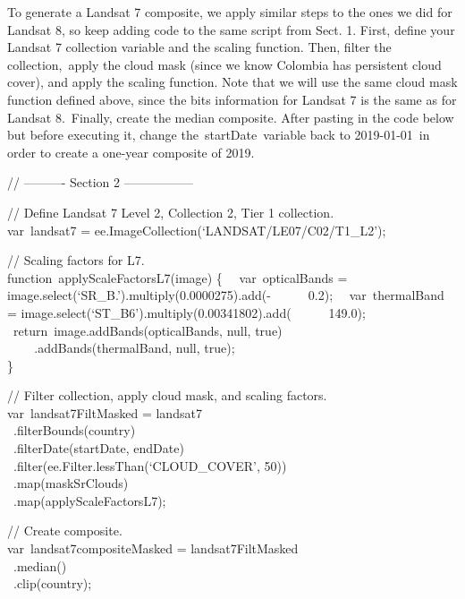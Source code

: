 \documentclass[
  letterpaper,
  DIV=11,
  numbers=noendperiod]{scrreprt}
\begin{document}
To generate a Landsat 7 composite, we apply similar steps to the ones we
did for Landsat 8, so keep adding code to the same script from Sect. 1.
First, define your Landsat 7 collection variable and the scaling
function. Then, filter the collection,~apply the cloud mask (since we
know Colombia has persistent cloud cover), and apply the scaling
function. Note that we will use the same cloud mask function defined
above, since the bits information for Landsat 7 is the same as for
Landsat 8.~Finally, create the median composite. After pasting in the
code below but before executing it, change the~startDate~variable back
to 2019-01-01~in order to create a one-year composite of 2019.

// ---------- Section 2 -----------------

// Define Landsat 7 Level 2, Collection 2, Tier 1 collection.\\
var~landsat7 = ee.ImageCollection(`LANDSAT/LE07/C02/T1\_L2');

// Scaling factors for L7.\\
function~applyScaleFactorsL7(image) \{~ ~var~opticalBands =
image.select(`SR\_B.').multiply(0.0000275).add(-~ ~ ~ ~0.2);~
~var~thermalBand = image.select(`ST\_B6').multiply(0.00341802).add(~ ~ ~
~149.0);~ ~return~image.addBands(opticalBands, null, true)\\
\hspace*{0.333em} ~ ~ ~.addBands(thermalBand, null, true);\\
\}

// Filter collection, apply cloud mask, and scaling factors.\\
var~landsat7FiltMasked = landsat7\\
\hspace*{0.333em} ~.filterBounds(country)\\
\hspace*{0.333em} ~.filterDate(startDate, endDate)\\
\hspace*{0.333em} ~.filter(ee.Filter.lessThan(`CLOUD\_COVER', 50))\\
\hspace*{0.333em} ~.map(maskSrClouds)\\
\hspace*{0.333em} ~.map(applyScaleFactorsL7);

// Create composite.\\
var~landsat7compositeMasked = landsat7FiltMasked\\
\hspace*{0.333em} ~.median()\\
\hspace*{0.333em} ~.clip(country);
\end{document}
